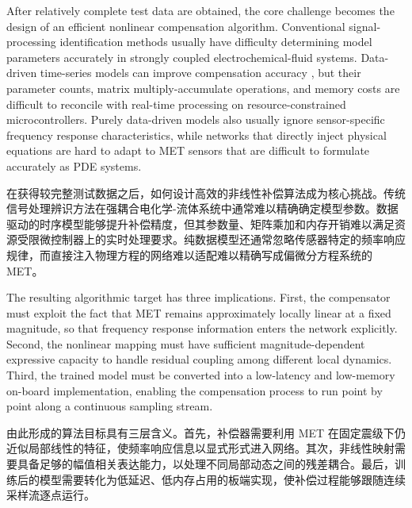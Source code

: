 \documentclass[sn-nature]{sn-jnl}
\newif\ifCNENEnglish
\newif\ifCNENBilingual
\newcommand{\CNEN}[2]{%
    \ifCNENBilingual
        #1%
        \if\relax\detokenize{#2}\relax\else\par #2\fi%
    \else
        \ifCNENEnglish
            #2%
        \else
            #1%
        \fi
    \fi
}
\begin{document}
\CNEN{在获得较完整测试数据之后，如何设计高效的非线性补偿算法成为核心挑战。传统信号处理辨识方法\cite{royOptimalModifiedHomotopy2023,jainModelOrderReduction2020,shawHybridAveragingHarmonic2023,helieInputOutputReduced2021}在强耦合电化学-流体系统中通常难以精确确定模型参数。数据驱动的时序模型能够提升补偿精度\cite{anandanatarajanDeepNeuralNetworkBased2023,zhaoDetectingEarlyDamages2020,thangamalarLinearisationFlowSensors2023}，但其参数量、矩阵乘加和内存开销难以满足资源受限微控制器上的实时处理要求。纯数据模型还通常忽略传感器特定的频率响应规律，而直接注入物理方程的网络\cite{wangEigenvectorBiasFourier2021}难以适配难以精确写成偏微分方程系统的 MET。}{After relatively complete test data are obtained, the core challenge becomes the design of an efficient nonlinear compensation algorithm. Conventional signal-processing identification methods \cite{royOptimalModifiedHomotopy2023,jainModelOrderReduction2020,shawHybridAveragingHarmonic2023,helieInputOutputReduced2021} usually have difficulty determining model parameters accurately in strongly coupled electrochemical-fluid systems. Data-driven time-series models can improve compensation accuracy \cite{anandanatarajanDeepNeuralNetworkBased2023,zhaoDetectingEarlyDamages2020,thangamalarLinearisationFlowSensors2023}, but their parameter counts, matrix multiply-accumulate operations, and memory costs are difficult to reconcile with real-time processing on resource-constrained microcontrollers. Purely data-driven models also usually ignore sensor-specific frequency response characteristics, while networks that directly inject physical equations \cite{wangEigenvectorBiasFourier2021} are hard to adapt to MET sensors that are difficult to formulate accurately as PDE systems.%
}

\CNEN{由此形成的算法目标具有三层含义。首先，补偿器需要利用 MET 在固定震级下仍近似局部线性的特征，使频率响应信息以显式形式进入网络。其次，非线性映射需要具备足够的幅值相关表达能力，以处理不同局部动态之间的残差耦合。最后，训练后的模型需要转化为低延迟、低内存占用的板端实现，使补偿过程能够跟随连续采样流逐点运行。}{The resulting algorithmic target has three implications. First, the compensator must exploit the fact that MET remains approximately locally linear at a fixed magnitude, so that frequency response information enters the network explicitly. Second, the nonlinear mapping must have sufficient magnitude-dependent expressive capacity to handle residual coupling among different local dynamics. Third, the trained model must be converted into a low-latency and low-memory on-board implementation, enabling the compensation process to run point by point along a continuous sampling stream.}
\end{document}
